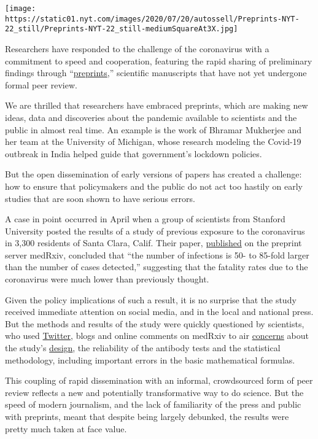 \texttt{[image: https://static01.nyt.com/images/2020/07/20/autossell/Preprints-NYT-22\_still/Preprints-NYT-22\_still-mediumSquareAt3X.jpg]}

Researchers have responded to the challenge of the coronavirus with a
commitment to speed and cooperation, featuring the rapid sharing of
preliminary findings through
``\href{https://connect.medrxiv.org/relate/content/181}{preprints},''
scientific manuscripts that have not yet undergone formal peer review.

We are thrilled that researchers have embraced preprints, which are
making new ideas, data and discoveries about the pandemic available to
scientists and the public in almost real time. An example is the work of
Bhramar Mukherjee and her team at the University of Michigan, whose
research modeling the Covid-19 outbreak in India helped guide that
government's lockdown policies.

But the open dissemination of early versions of papers has created a
challenge: how to ensure that policymakers and the public do not act too
hastily on early studies that are soon shown to have serious errors.

A case in point occurred in April when a group of scientists from
Stanford University posted the results of a study of previous exposure
to the coronavirus in 3,300 residents of Santa Clara, Calif. Their
paper,
\href{https://www.medrxiv.org/content/10.1101/2020.04.14.20062463v1?versioned=true}{published}
on the preprint server medRxiv, concluded that ``the number of
infections is 50- to 85-fold larger than the number of cases detected,''
suggesting that the fatality rates due to the coronavirus were much
lower than previously thought.

Given the policy implications of such a result, it is no surprise that
the study received immediate attention on social media, and in the local
and national press. But the methods and results of the study were
quickly questioned by scientists, who used
\href{https://twitter.com/wfithian/status/1252692357788479488?s=20}{Twitter},
blogs and online comments on medRxiv to air
\href{https://undark.org/2020/04/24/john-ioannidis-covid-19-death-rate-critics/}{concerns}
about the study's
\href{https://statmodeling.stat.columbia.edu/2020/04/19/fatal-flaws-in-stanford-study-of-coronavirus-prevalence/}{design},
the reliability of the antibody tests and the statistical methodology,
including important errors in the basic mathematical formulas.

This coupling of rapid dissemination with an informal, crowdsourced form
of peer review reflects a new and potentially transformative way to do
science. But the speed of modern journalism, and the lack of familiarity
of the press and public with preprints, meant that despite being largely
debunked, the results were pretty much taken at face value.

